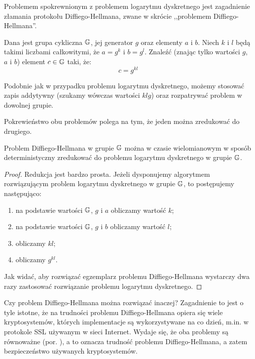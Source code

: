 \noindent
Problemem spokrewnionym z problemem logarytmu dyskretnego
jest zagadnienie złamania protokołu Diffiego-Hellmana,
zwane w skrócie ,,problemem Diffiego-Hellmana''.

\begin{problem}
Dana jest grupa cykliczna $\mathbb{G}$,
jej generator $g$
oraz elementy $a$ i $b$.
Niech $k$ i $l$ będą takimi liczbami całkowitymi,
że $a = g^k$ i $b = g^l$.
Znaleźć (znając tylko wartości $g$, $a$ i $b$)
element $c \in \mathbb{G}$ taki, że:
\begin{equation}
c = g^{kl}
\end{equation}
\end{problem}

\begin{remark}
Podobnie jak w przypadku problemu logarytmu dyskretnego,
możemy stosować zapis addytywny (szukamy wówczas wartości $klg$)
oraz rozpatrywać problem w dowolnej grupie.
\end{remark}

\noindent
Pokrewieństwo obu problemów polega na tym,
że jeden można zredukować do drugiego.

\begin{theorem}
Problem Diffiego-Hellmana w grupie $\mathbb{G}$ można
w czasie wielomianowym w sposób deterministyczny
zredukować do problemu logarytmu dyskretnego w grupie $\mathbb{G}$.
\end{theorem}

\begin{proof}
Redukcja jest bardzo prosta.
Jeżeli dysponujemy algorytmem rozwiązującym
problem logarytmu dyskretnego w grupie $\mathbb{G}$,
to postępujemy następująco:
\begin{enumerate}
\item na podstawie wartości $\mathbb{G}$, $g$ i $a$ obliczamy wartość $k$;
\item na podstawie wartości $\mathbb{G}$, $g$ i $b$ obliczamy wartość $l$;
\item obliczamy $kl$;
\item obliczamy $g^{kl}$.
\end{enumerate}
Jak widać, aby rozwiązać egzemplarz problemu Diffiego-Hellmana
wystarczy dwa razy zastosować rozwiązanie problemu logarytmu dyskretnego.
\end{proof}

\noindent
Czy problem Diffiego-Hellmana można rozwiązać inaczej?
Zagadnienie to jest o tyle istotne,
że na trudności problemu Diffiego-Hellmana
opiera się wiele kryptosystemów,
których implementacje są wykorzystywane na co dzień,
m.in. w protokole SSL używanym w sieci Internet.
Wydaje się, że oba problemy są równoważne (por. \cite{maurer}),
a to oznacza trudność problemu Diffiego-Hellmana,
a zatem bezpieczeństwo używanych kryptosystemów.

